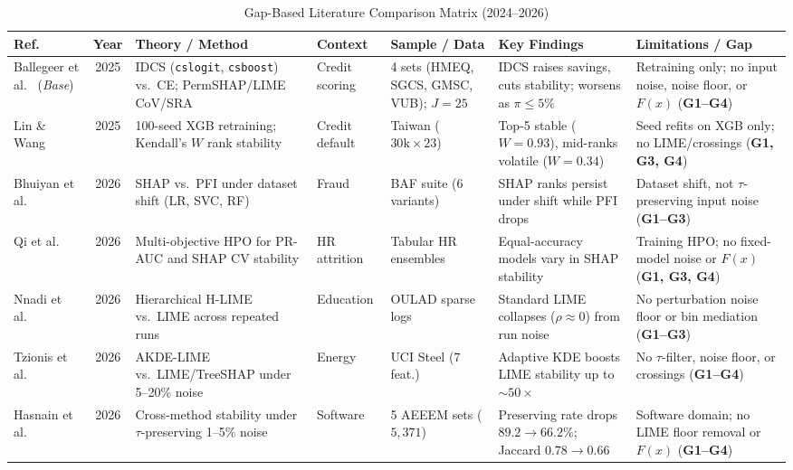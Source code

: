 \documentclass[conference]{IEEEtran}
\begin{document}
\begin{table}[!t]
\centering
\caption{Gap-Based Literature Comparison Matrix (2024--2026)}
\label{tab:lit_gap}
\scriptsize
\renewcommand{\arraystretch}{0.77}
\setlength{\tabcolsep}{2.4pt}
\begin{tabular}{@{}p{1.9cm}cp{2.8cm}p{1.6cm}p{2.1cm}p{3.6cm}p{3.6cm}@{}}
\toprule
\textbf{Ref.} & \textbf{Year} & \textbf{Theory / Method} & \textbf{Context} & \textbf{Sample / Data} & \textbf{Key Findings} & \textbf{Limitations / Gap} \\
\midrule
Ballegeer et al.~\cite{ballegeer2025} (\textit{Base}) & 2025 & IDCS (\texttt{cslogit}, \texttt{csboost}) vs.\ CE; PermSHAP/LIME CoV/SRA & Credit scoring & 4 sets (HMEQ, SGCS, GMSC, VUB); $J{=}25$ & IDCS raises savings, cuts stability; worsens as $\pi{\le}5\%$ & Retraining only; no input noise, noise floor, or $F(x)$ (\textbf{G1--G4}) \\
Lin \& Wang~\cite{lin2025shap} & 2025 & 100-seed XGB retraining; Kendall's $W$ rank stability & Credit default & Taiwan ($30\text{k}{\times}23$) & Top-5 stable ($W{=}0.93$), mid-ranks volatile ($W{=}0.34$) & Seed refits on XGB only; no LIME/crossings (\textbf{G1, G3, G4}) \\
Bhuiyan et al.~\cite{bhuiyan2026} & 2026 & SHAP vs.\ PFI under dataset shift (LR, SVC, RF) & Fraud & BAF suite (6 variants) & SHAP ranks persist under shift while PFI drops & Dataset shift, not $\tau$-preserving input noise (\textbf{G1--G3}) \\
Qi et al.~\cite{qi2026} & 2026 & Multi-objective HPO for PR-AUC and SHAP CV stability & HR attrition & Tabular HR ensembles & Equal-accuracy models vary in SHAP stability & Training HPO; no fixed-model noise or $F(x)$ (\textbf{G1, G3, G4}) \\
Nnadi et al.~\cite{nnadi2026} & 2026 & Hierarchical H-LIME vs.\ LIME across repeated runs & Education & OULAD sparse logs & Standard LIME collapses ($\rho{\approx}0$) from run noise & No perturbation noise floor or bin mediation (\textbf{G1--G3}) \\
Tzionis et al.~\cite{tzionis2026} & 2026 & AKDE-LIME vs.\ LIME/TreeSHAP under 5--20\% noise & Energy & UCI Steel ($7$ feat.) & Adaptive KDE boosts LIME stability up to ${\sim}50{\times}$ & No $\tau$-filter, noise floor, or crossings (\textbf{G1--G4}) \\
Hasnain et al.~\cite{hasnain2026} & 2026 & Cross-method stability under $\tau$-preserving 1--5\% noise & Software & 5 AEEEM sets ($5{,}371$) & Preserving rate drops $89.2{\to}66.2\%$; Jaccard $0.78{\to}0.66$ & Software domain; no LIME floor removal or $F(x)$ (\textbf{G1--G4}) \\

\end{tabular}
\end{table}
\end{document}
